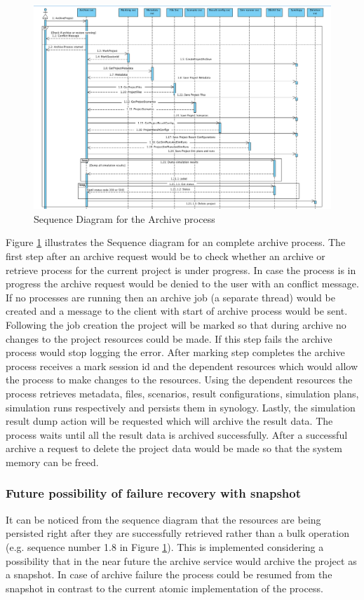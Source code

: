 \newpage
\begin{figure}[H]
    \centering \includegraphics[scale=0.5, angle=90, origin=c]{grafiken/sequenceArchive.png}
    \caption{Sequence Diagram for the Archive process}
    \label{fig:sequenceArchive}
\end{figure}

Figure \ref{fig:sequenceArchive} illustrates the Sequence diagram for an complete archive process. The first step after an archive request would be to check
whether an archive or retrieve process for the current project is under progress. In case the process is in progress the archive request would be denied to the
user with an conflict message. If no processes are running then an archive job (a separate thread) would be created and a message to the client with start of archive process would be
sent. Following the job creation the project will be marked so that during archive no changes to the project resources could be made. If this step fails the archive 
process would stop logging the error. After marking step completes the archive process receives a mark session id and the dependent resources which would allow the process to make
changes to the resources. Using the dependent resources the process retrieves metadata, files, scenarios, result configurations, simulation plans, simulation runs 
respectively and persists them in synology. Lastly, the simulation result dump action will be requested which will archive the result data. The process waits until
all the result data is archived successfully. After a successful archive a request to delete the project data would be made so that the system memory can be freed.

\subsubsection{Future possibility of failure recovery with snapshot}
It can be noticed from the sequence diagram that the resources are being persisted right after they are successfully retrieved rather than a bulk operation
(e.g. sequence number 1.8 in Figure \ref{fig:sequenceArchive}). This
is implemented considering a possibility that in the near future the archive service would archive the project as a snapshot. In case of archive failure the process
could be resumed from the snapshot in contrast to the current atomic implementation of the process.

